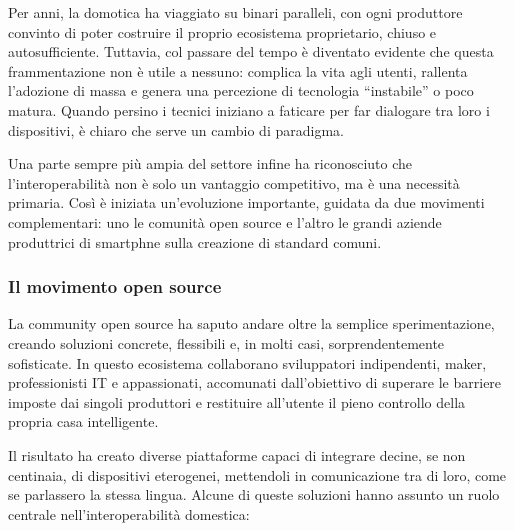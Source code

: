 Per anni, la domotica ha viaggiato su binari paralleli, con ogni produttore convinto di poter costruire il proprio ecosistema proprietario, chiuso e autosufficiente. Tuttavia, col passare del tempo è diventato evidente che questa frammentazione non è utile a nessuno: complica la vita agli utenti, rallenta l’adozione di massa e genera una percezione di tecnologia “instabile” o poco matura. Quando persino i tecnici iniziano a faticare per far dialogare tra loro i dispositivi, è chiaro che serve un cambio di paradigma.

Una parte sempre più ampia del settore infine ha riconosciuto che l’interoperabilità non è solo un vantaggio competitivo, ma è una necessità primaria. Così è iniziata un’evoluzione importante, guidata da due movimenti complementari: uno le comunità open source e l’altro le grandi aziende produttrici di smartphne sulla creazione di standard comuni.

\subsubsection{Il movimento open source}

La community open source ha saputo andare  oltre la semplice sperimentazione, creando soluzioni concrete, flessibili e, in molti casi, sorprendentemente sofisticate. In questo ecosistema collaborano sviluppatori indipendenti, maker, professionisti IT e appassionati, accomunati dall’obiettivo di superare le barriere imposte dai singoli produttori e restituire all’utente il pieno controllo della propria casa intelligente.

Il risultato ha creato diverse piattaforme capaci di integrare decine, se non centinaia, di dispositivi eterogenei, mettendoli in comunicazione tra di loro, come se parlassero la stessa lingua. Alcune di queste soluzioni hanno assunto un ruolo centrale nell’interoperabilità domestica:

